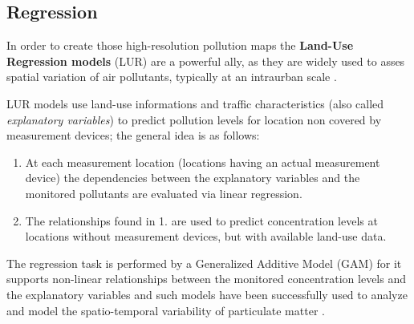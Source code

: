 \documentclass[11pt,a4paper,titlepage]{book}
\begin{document}
\subsection{Regression}
In order to create those high-resolution pollution maps the \textbf{Land-Use Regression models} (LUR) are a powerful ally, as they are widely used to asses spatial variation of air pollutants, typically at an intraurban scale \cite{lurmodels}.

LUR models use land-use informations and traffic characteristics (also called \textit{explanatory variables}) to predict pollution levels for location non covered by measurement devices; the general idea is as follows:
\begin{enumerate}
    \item At each measurement location (locations having an actual measurement device) the dependencies between the explanatory variables and the monitored pollutants are evaluated via linear regression.
    \item The relationships found in 1. are used to predict concentration levels at locations without measurement devices, but with available land-use data.
\end{enumerate}
The regression task is performed by a Generalized Additive Model (GAM) for it supports non-linear relationships between the monitored concentration levels and the explanatory variables and such models have been successfully used to analyze and model the spatio-temporal variability of particulate matter \cite{meteo-influence-pm}.
\end{document}
